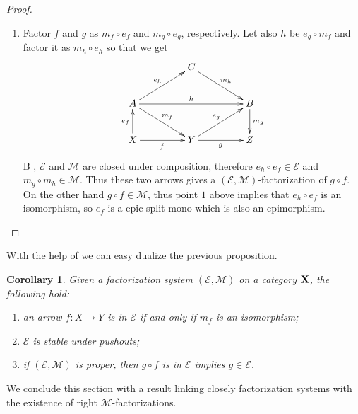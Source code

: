 \documentclass[a4paper]{article}
\def\X{\textbf {\textup{X}}}
\newtheorem{corollary}[theorem]{Corollary}
\theoremstyle{definition}
\begin{document}
\begin{proof}
\begin{enumerate}
			\item 
		Factor $f$ and $g$ as $m_f\circ e_f$ and $m_g\circ e_g$, respectively. Let also $h$ be $e_g\circ m_f$ and factor it as $m_h\circ e_h$ so that we get 
		\[\xymatrix@C=45pt{& C \ar[dr]^{m_h}&\\
			A\ar[ur]^{e_h} \ar[rr]^{h}  \ar[dr]^{m_f}& &B \ar[d]^{m_g}\\
			X \ar[u]^{e_f} \ar[r]_f& Y \ar[r]_g \ar[ur]^{e_g} & Z}\]
	B , $\mathcal{E}$ and $\mathcal{M}$ are closed under composition, therefore $e_h\circ e_f\in \mathcal{E}$ and $m_g \circ m_h\in \mathcal{M}$. Thus these two arrows gives a $(\mathcal{E}, \mathcal{M})$-factorization of $g\circ f$. On the other hand $g\circ f\in \mathcal{M}$, thus point $1$ above  implies that  $e_h\circ e_f$ is an isomorphism, so $e_f$ is a epic split mono which is also an epimorphism. \qedhere
	\end{enumerate}
\end{proof}

With the help of  we can easy dualize the previous proposition.
\begin{corollary}\label{cor:iso2}
	Given a factorization system $(\mathcal{E}, \mathcal{M})$ on a category $\X$, the following hold:
	\begin{enumerate}
		\item an arrow $f\colon X\to Y$ is in $\mathcal{E}$ if and only if $m_f$ is an isomorphism;
		\item $\mathcal{E}$ is stable under pushouts;
		\item  if $(\mathcal{E}, \mathcal{M})$ is proper, then $g\circ f$ is in $\mathcal{E}$ implies $g\in \mathcal{E}$.
	\end{enumerate}
\end{corollary}

We conclude this section with a result linking closely factorization systems with the existence of right $\mathcal{M}$-factorizations.
\end{document}
